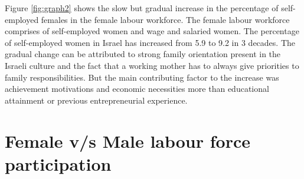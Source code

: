 \documentclass[11pt,a4paper,]{article}
\newenvironment{Shaded}{\begin{snugshade}}{\end{snugshade}}
\newcommand{\DataTypeTok}[1]{\textcolor[rgb]{0.13,0.29,0.53}{#1}}
\newcommand{\DecValTok}[1]{\textcolor[rgb]{0.00,0.00,0.81}{#1}}
\newcommand{\KeywordTok}[1]{\textcolor[rgb]{0.13,0.29,0.53}{\textbf{#1}}}
\newcommand{\NormalTok}[1]{#1}
\newcommand{\OperatorTok}[1]{\textcolor[rgb]{0.81,0.36,0.00}{\textbf{#1}}}
\newcommand{\StringTok}[1]{\textcolor[rgb]{0.31,0.60,0.02}{#1}}
\begin{document}
Figure \ref{fig:graph2} shows the slow but gradual increase in the percentage of self-employed females in the female labour workforce. The female labour workforce comprises of self-employed women and wage and salaried women. The percentage of self-employed women in Israel has increased from 5.9 to 9.2 in 3 decades. The gradual change can be attributed to strong family orientation present in the Israeli culture and the fact that a working mother has to always give priorities to family responsibilities. But the main contributing factor to the increase was achievement motivations and economic necessities more than educational attainment or previous entrepreneurial experience. \textcite{lerner1997israeli}

\hypertarget{female-vs-male-labour-force-participation}{%
\section{Female v/s Male labour force participation}\label{female-vs-male-labour-force-participation}}

\begin{Shaded}
\end{Shaded}
\end{document}
